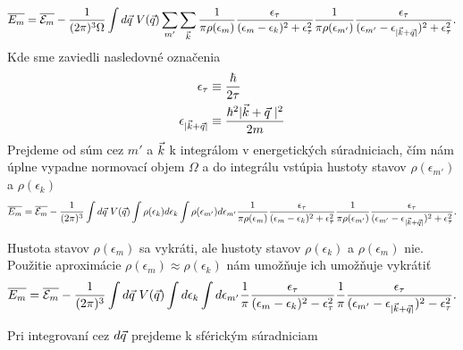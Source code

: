 \begin{align}
\label{eq:05energy3}
\overline{E_m}=\overline{\E_m} - \frac{1}{(2\pi)^3\Omega} \int d\vq\ V(\vq) \sum_{m'}\sum_{\vk}\frac{1}{\pi\rho(\epsilon_m)}\frac{\epsilon_\tau}{(\epsilon_m-\epsilon_k)^2+\epsilon_\tau^2}\frac{1}{\pi\rho(\epsilon_{m'})}\frac{\epsilon_\tau}{(\epsilon_{m'}-\epsilon_{|\vk+\vq|})^2+\epsilon_\tau^2} \text{.}
\end{align}
Kde sme zaviedli nasledovné označenia
\begin{align*}
\epsilon_\tau &\equiv \frac{\hbar}{2\tau} \\
\epsilon_{|\vec{k}+\vec{q}|}&\equiv\frac{\hbar^2|\vec{k}+\vec{q}\ |^2}{2m}
\end{align*}
Prejdeme od súm cez $m'$ a $\vec{k}$ k integrálom v energetických súradniciach, čím nám úplne vypadne normovací objem $\Omega$ a do integrálu vstúpia hustoty stavov $\rho(\epsilon_{m'})$ a $\rho(\epsilon_k)$
\begin{align}
\overline{E_m}=\overline{\E_m} - \frac{1}{(2\pi)^3} \int d\vq\ V(\vq)\int \rho(\epsilon_k)d\epsilon_k \int \rho(\epsilon_{m'})d\epsilon_{m'}\frac{1}{\pi\rho(\epsilon_m)}\frac{\epsilon_\tau}{(\epsilon_m-\epsilon_k)^2+\epsilon_\tau^2}\frac{1}{\pi\rho(\epsilon_{m'})}\frac{\epsilon_\tau}{(\epsilon_{m'}-\epsilon_{|\vk+\vq|})^2+\epsilon_\tau^2} \text{.}
\end{align}


Hustota stavov $\rho(\epsilon_m)$ sa vykráti, ale hustoty stavov $\rho(\epsilon_{k})$ a $\rho(\epsilon_m)$ nie. Použitie aproximácie $\rho(\epsilon_m)\approx\rho(\epsilon_k)$ nám umožňuje ich umožňuje vykrátiť
\begin{align}
\label{eq:energy_vykratene}
\overline{E_m}=\overline{\E_m} - \frac{1}{(2\pi)^3} \int d\vq\ V(\vq)\int d\epsilon_k \int d\epsilon_{m'}\frac{1}{\pi}\frac{\epsilon_\tau}{(\epsilon_m-\epsilon_k)^2-\epsilon_\tau^2}\frac{1}{\pi}\frac{\epsilon_\tau}{(\epsilon_{m'}-\epsilon_{|\vk+\vq|})^2-\epsilon_\tau^2} \text{.}
\end{align}

Pri integrovaní cez $d\vec{q}$  prejdeme k sférickým súradniciam

